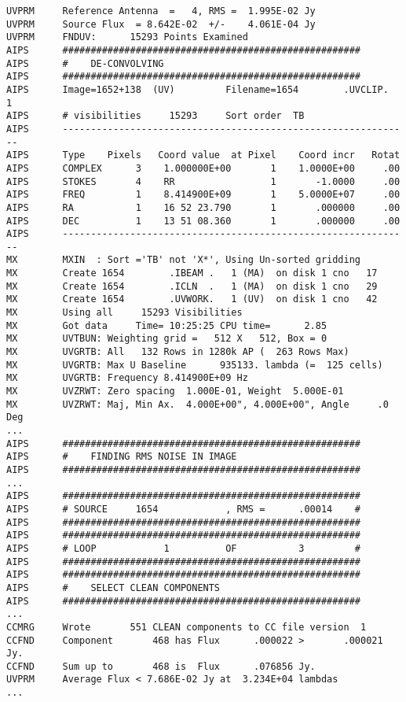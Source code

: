\begin{verbatim}
UVPRM     Reference Antenna  =   4, RMS =  1.995E-02 Jy
UVPRM     Source Flux  = 8.642E-02  +/-    4.061E-04 Jy
UVPRM     FNDUV:      15293 Points Examined
AIPS      #####################################################
AIPS      #    DE-CONVOLVING
AIPS      #####################################################
AIPS      Image=1652+138  (UV)         Filename=1654        .UVCLIP.   1
AIPS      # visibilities     15293     Sort order  TB
AIPS      --------------------------------------------------------------
AIPS      Type    Pixels   Coord value  at Pixel    Coord incr   Rotat
AIPS      COMPLEX      3    1.000000E+00       1    1.0000E+00     .00
AIPS      STOKES       4    RR                 1       -1.0000     .00
AIPS      FREQ         1    8.414900E+09       1    5.0000E+07     .00
AIPS      RA           1    16 52 23.790       1       .000000     .00
AIPS      DEC          1    13 51 08.360       1       .000000     .00
AIPS      --------------------------------------------------------------
MX        MXIN  : Sort ='TB' not 'X*', Using Un-sorted gridding
MX        Create 1654        .IBEAM .   1 (MA)  on disk 1 cno   17
MX        Create 1654        .ICLN  .   1 (MA)  on disk 1 cno   29
MX        Create 1654        .UVWORK.   1 (UV)  on disk 1 cno   42
MX        Using all     15293 Visibilities
MX        Got data     Time= 10:25:25 CPU time=      2.85
MX        UVTBUN: Weighting grid =   512 X   512, Box = 0
MX        UVGRTB: All   132 Rows in 1280k AP (  263 Rows Max)
MX        UVGRTB: Max U Baseline      935133. lambda (=  125 cells)
MX        UVGRTB: Frequency 8.414900E+09 Hz
MX        UVZRWT: Zero spacing  1.000E-01, Weight  5.000E-01
MX        UVZRWT: Maj, Min Ax.  4.000E+00", 4.000E+00", Angle     .0 Deg
...
AIPS      #####################################################
AIPS      #    FINDING RMS NOISE IN IMAGE
AIPS      #####################################################
...
AIPS      #####################################################
AIPS      # SOURCE     1654            , RMS =      .00014    #
AIPS      #####################################################
AIPS      #####################################################
AIPS      # LOOP            1          OF           3         #
AIPS      #####################################################
AIPS      #####################################################
AIPS      #    SELECT CLEAN COMPONENTS
AIPS      #####################################################
...
CCMRG     Wrote       551 CLEAN components to CC file version  1
CCFND     Component       468 has Flux      .000022 >       .000021 Jy.
CCFND     Sum up to       468 is  Flux      .076856 Jy.
UVPRM     Average Flux < 7.686E-02 Jy at  3.234E+04 lambdas
...



\end{verbatim}

